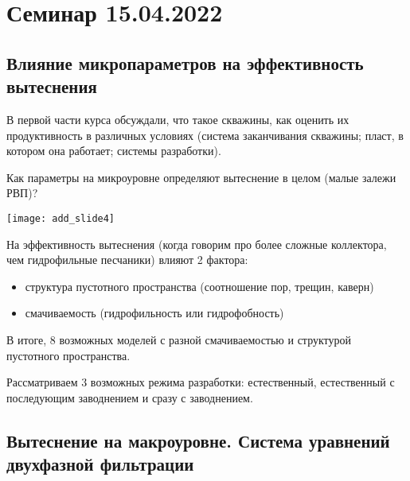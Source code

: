 \documentclass[main.tex]{subfiles}
\begin{document}
\section{Семинар 15.04.2022}

\subsection{Влияние микропараметров на эффективность вытеснения}

В первой части курса обсуждали, что такое скважины, как оценить их продуктивность в различных условиях (система заканчивания скважины; пласт, в котором она работает; системы разработки).

Как параметры на микроуровне определяют вытеснение в целом (малые залежи РВП)?

\texttt{[image: add\_slide4]}








На эффективность вытеснения (когда говорим про более сложные коллектора, чем гидрофильные песчаники) влияют 2 фактора:
\begin{itemize}
	\item структура пустотного пространства (соотношение пор, трещин, каверн)
	\item смачиваемость (гидрофильность или гидрофобность)
\end{itemize}
В итоге, 8 возможных моделей с разной смачиваемостью и структурой пустотного пространства.


Рассматриваем 3 возможных режима разработки: естественный, естественный с последующим заводнением и сразу с заводнением.


\subsection{Вытеснение на макроуровне. Система уравнений двухфазной фильтрации}
\end{document}
